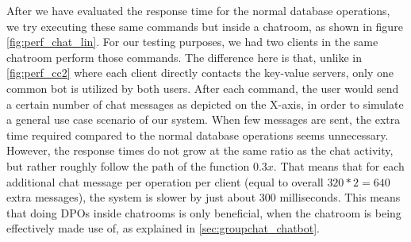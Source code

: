 After we have evaluated the response time for the normal database operations, we try executing these same commands but inside a chatroom, as shown in figure \ref{fig:perf_chat_lin}. For our testing purposes, we had two clients in the same chatroom perform those commands. The difference here is that, unlike in \ref{fig:perf_cc2} where each client directly contacts the key-value servers, only one common bot is utilized by both users. After each command, the user would send a certain number of chat messages as depicted on the X-axis, in order to simulate a general use case scenario of our system.
When few messages are sent, the extra time required compared to the normal database operations seems unnecessary. 
However, the response times do not grow at the same ratio as the chat activity, but rather roughly follow the path of the function \begin{math}0.3x\end{math}. That means that for each additional chat message per operation per client (equal to overall \begin{math}320 * 2 = 640\end{math} extra messages), the system is slower by just about 300 milliseconds. This means that doing DPOs inside chatrooms is only beneficial, when the chatroom is being effectively made use of, as explained in \ref{sec:groupchat_chatbot}.